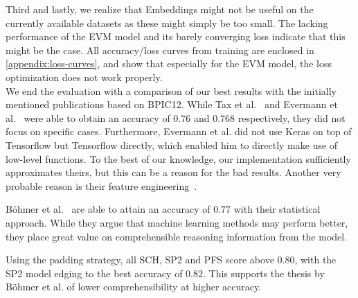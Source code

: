 Third and lastly, we realize that Embeddings might not be useful on the currently available datasets as these might simply be too small. The lacking performance of the EVM model and its barely converging loss indicate that this might be the case. All accuracy/loss curves from training are enclosed in \autoref{appendix:loss-curves}, and show that especially for the EVM model, the loss optimization does not work properly.\\

We end the evaluation with a comparison of our best results with the initially mentioned publications based on BPIC12. While Tax et al.~\cite{tax2017} and Evermann et al.~\cite{evermann2016} were able to obtain an accuracy of $0.76$ and $0.768$ respectively, they did not focus on specific cases. Furthermore, Evermann et al. did not use Keras on top of Tensorflow but Tensorflow directly, which enabled him to directly make use of low-level functions. To the best of our knowledge, our implementation sufficiently approximates theirs, but this can be a reason for the bad results. Another very probable reason is their feature engineering~\cite{evermann2016}.

Böhmer et al.~\cite{boehmer2018probability} are able to attain an accuracy of $0.77$ with their statistical approach. While they argue that machine learning methods may perform better, they place great value on comprehensible reasoning information from the model.

Using the padding strategy, all SCH, SP2 and PFS score above $0.80$, with the SP2 model edging to the best accuracy of $0.82$. This supports the thesis by Böhmer et al. of lower comprehensibility at higher accuracy.
